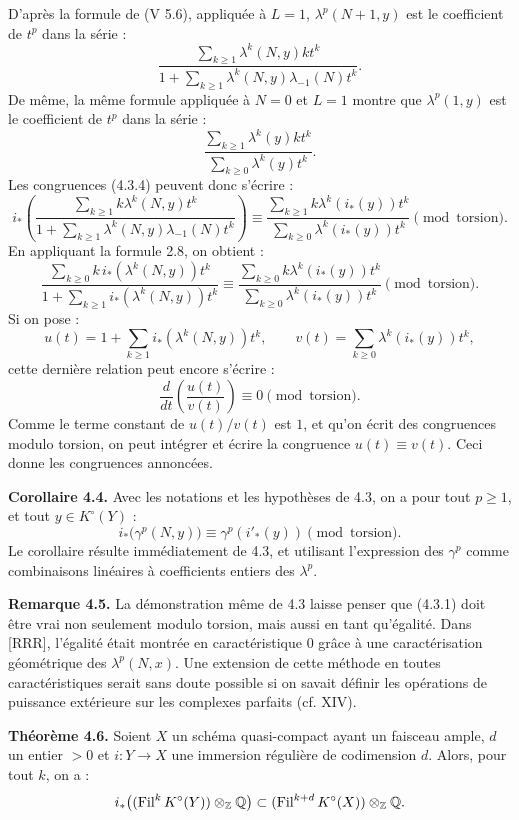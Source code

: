 D'après la formule de (V 5.6), appliquée à \(L=1\), \(\lambda^p(N+1,y)\) est le coefficient de \(t^p\) dans la série :
\[
  \frac{\sum_{k\ge1}\lambda^k(N,y)kt^k}
       {1+\sum_{k\ge1}\lambda^k(N,y)\lambda_{-1}(N)t^k}.
\]
De même, la même formule appliquée à \(N=0\) et \(L=1\) montre que \(\lambda^p(1,y)\) est le coefficient de \(t^p\) dans la série :
\[
  \frac{\sum_{k\ge1}\lambda^k(y)kt^k}
       {\sum_{k\ge0}\lambda^k(y)t^k}.
\]
Les congruences (4.3.4) peuvent donc s'écrire :
\[
i_*\left(
  \frac{\sum_{k\ge1}k\lambda^k(N,y)t^k}
       {1+\sum_{k\ge1}\lambda^k(N,y)\lambda_{-1}(N)t^k}
\right)
\equiv
  \frac{\sum_{k\ge1}k\lambda^k(i_*(y))t^k}
       {\sum_{k\ge0}\lambda^k(i_*(y))t^k}
       \pmod{\text{torsion}}.
\]
En
appliquant la formule 2.8, on obtient :
\[
  \frac{\sum_{k\ge0}k\,i_*(\lambda^k(N,y))t^k}
       {1+\sum_{k\ge1} i_*(\lambda^k(N,y))t^k}
  \equiv
  \frac{\sum_{k\ge0}k\lambda^k(i_*(y))t^k}
       {\sum_{k\ge0}\lambda^k(i_*(y))t^k}
       \pmod{\text{torsion}}.
\]
Si on pose :
\[
  u(t)=1+\sum_{k\ge1}i_*(\lambda^k(N,y))t^k,\qquad
  v(t)=\sum_{k\ge0}\lambda^k(i_*(y))t^k,
\]
cette dernière relation peut encore s'écrire :
\[
  \frac{d}{dt}\!\left(\frac{u(t)}{v(t)}\right)\equiv0
  \pmod{\text{torsion}}.
\]
Comme le terme constant de \(u(t)/v(t)\) est \(1\), et qu'on écrit des congruences modulo torsion, on peut intégrer et écrire la congruence \(u(t)\equiv v(t)\). Ceci donne les congruences annoncées.

\textbf{Corollaire 4.4.} Avec les notations et les hypothèses de 4.3, on a pour tout \(p\ge1\), et tout \(y\in K^\circ(Y)\) :
\[
  i_*\bigl(\gamma^p(N,y)\bigr)\equiv \gamma^p(i'_*(y))
  \pmod{\text{torsion}}.
\]
Le corollaire résulte immédiatement de 4.3, et utilisant l'expression des \(\gamma^p\) comme combinaisons linéaires à coefficients entiers des \(\lambda^p\).

\textbf{Remarque 4.5.} La démonstration même de 4.3 laisse penser que (4.3.1) doit être vrai non seulement modulo torsion, mais aussi en tant qu'égalité. Dans [RRR], l'égalité était montrée en caractéristique \(0\) grâce à une caractérisation géométrique des \(\lambda^p(N,x)\). Une extension de cette méthode en toutes caractéristiques serait sans doute possible si on savait définir les opérations de puissance extérieure sur les complexes parfaits (cf. XIV).

\textbf{Théorème 4.6.}
Soient \(X\) un schéma quasi-compact ayant un faisceau ample, \(d\) un entier \(>0\) et \(i:Y\to X\) une immersion régulière de codimension \(d\). Alors, pour tout \(k\), on a :
\[
 i_*\bigl((\operatorname{Fil}^kK^\circ(Y))\otimes_{\mathbb Z}\mathbb Q\bigr)
 \subset
 (\operatorname{Fil}^{k+d}K^\circ(X))\otimes_{\mathbb Z}\mathbb Q.
\]

